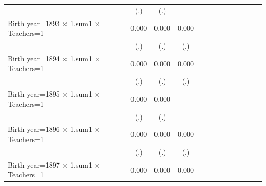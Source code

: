 {\begin{tabular}{l*{12}{c}}
                    &         (.)   &         (.)   &               &               &               &               &               &               &               &               &               &               \\
Birth year=1893 $\times$ 1.sum1 $\times$ Teachers=1&       0.000   &       0.000   &       0.000   &               &               &               &               &               &               &               &               &               \\
                    &         (.)   &         (.)   &         (.)   &               &               &               &               &               &               &               &               &               \\
Birth year=1894 $\times$ 1.sum1 $\times$ Teachers=1&       0.000   &       0.000   &       0.000   &               &               &               &               &               &               &               &               &               \\
                    &         (.)   &         (.)   &         (.)   &               &               &               &               &               &               &               &               &               \\
Birth year=1895 $\times$ 1.sum1 $\times$ Teachers=1&       0.000   &       0.000   &               &               &               &               &               &               &               &               &               &               \\
                    &         (.)   &         (.)   &               &               &               &               &               &               &               &               &               &               \\
Birth year=1896 $\times$ 1.sum1 $\times$ Teachers=1&       0.000   &       0.000   &       0.000   &               &               &               &               &               &               &               &               &               \\
                    &         (.)   &         (.)   &         (.)   &               &               &               &               &               &               &               &               &               \\
Birth year=1897 $\times$ 1.sum1 $\times$ Teachers=1&       0.000   &       0.000   &       0.000   &               &               &               &               &               &               &               &               &               \\

\end{tabular}}
